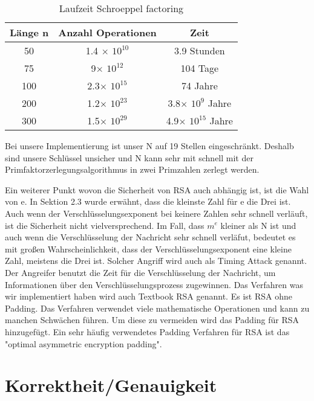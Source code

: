 \documentclass[course=asp]{aspdoc}
\begin{document}
\begin{table}[H]
\centering
   \begin{tabular}{||c c c||} 
 \hline
 Länge n & Anzahl Operationen & Zeit  \\ [0.5ex] 
 \hline\hline
 50 & 1.4 $\times$ $10^{10}$  & 3.9 Stunden  \\ 
 \hline
 75 & 9$\times $ $10^{12}$  & 104 Tage  \\
 \hline
 100 & 2.3$\times $ $10^{15}$ & 74 Jahre  \\
 \hline
 200 & 1.2$\times $ $10^{23}$ & 3.8$\times $ $10^{9}$ Jahre\\
 \hline
 300 & 1.5$\times $ $10^{29}$ & 4.9$\times $ $10^{15}$ Jahre \\ [1ex] 
 \hline

\end{tabular}
    \caption{Laufzeit Schroeppel factoring}
\end{table}
Bei unsere Implementierung ist unser N auf 19 Stellen eingeschränkt. Deshalb sind unsere Schlüssel unsicher und N kann sehr mit schnell mit der Primfaktorzerlegungsalgorithmus in zwei Primzahlen zerlegt werden.
 
Ein weiterer Punkt wovon die Sicherheit von RSA auch abhängig ist, ist die Wahl von e. In Sektion 2.3 wurde erwähnt, dass die kleinste Zahl für e die Drei ist. Auch wenn der Verschlüsselungsexponent bei keinere Zahlen sehr schnell verläuft, ist die Sicherheit nicht vielversprechend. Im Fall, dass $m^{e}$ kleiner als N ist und auch wenn die Verschlüsselung der Nachricht sehr schnell verläfut, bedeutet es mit großen Wahrscheinlichkeit, dass der Verschlüsselungsexponent eine kleine Zahl, meistens die Drei ist. Solcher Angriff wird auch als Timing Attack genannt. Der Angreifer benutzt die Zeit für die Verschlüsselung der Nachricht, um Informationen über den Verschlüsselungsprozess zugewinnen. 
Das Verfahren was wir implementiert haben wird auch Textbook RSA genannt. Es ist RSA ohne Padding. Das Verfahren verwendet viele mathematische Operationen und kann zu manchen Schwächen führen. Um diese zu vermeiden wird das Padding für RSA hinzugefügt.  Ein sehr häufig verwendetes Padding Verfahren für RSA ist das "optimal asymmetric encryption padding". \cite{AttacksOnRSA}




\section{Korrektheit/Genauigkeit}
\end{document}
